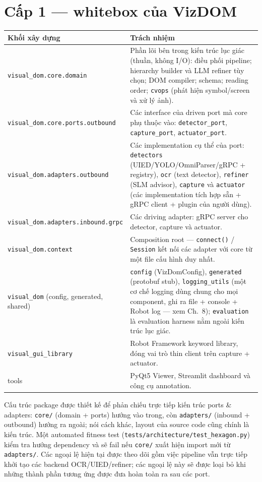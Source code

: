 \documentclass[11pt,a4paper]{report}
\newcommand{\code}[1]{\texttt{#1}}
\begin{document}
\section{Cấp 1 --- whitebox của VizDOM}
\begin{longtable}{@{}p{3.8cm}p{10.8cm}@{}}
\toprule
\textbf{Khối xây dựng} & \textbf{Trách nhiệm} \\
\midrule
\endhead
\code{visual\_dom.core.domain} & Phần lõi bên trong kiến trúc lục giác (thuần, không I/O): điều phối pipeline; hierarchy builder và LLM refiner tùy chọn; DOM compiler; schema; reading order; \code{cvops} (phát hiện symbol/screen và xử lý ảnh). \\
\code{visual\_dom.core.ports.\allowbreak outbound} & Các interface của driven port mà core phụ thuộc vào: \code{detector\_port}, \code{capture\_port}, \code{actuator\_port}. \\
\code{visual\_dom.adapters.\allowbreak outbound} & Các implementation cụ thể của port: \code{detectors} (UIED/YOLO/OmniParser/gRPC + registry), \code{ocr} (text detector), \code{refiner} (SLM advisor), \code{capture} và \code{actuator} (các implementation tích hợp sẵn + gRPC client + plugin của người dùng). \\
\code{visual\_dom.adapters.\allowbreak inbound.grpc} & Các driving adapter: gRPC server cho detector, capture và actuator. \\
\code{visual\_dom.context} & Composition root --- \code{connect()} / \code{Session} kết nối các adapter với core từ một file cấu hình duy nhất. \\
\code{visual\_dom} (config, generated, shared) & \code{config} (VizDomConfig), \code{generated} (protobuf stub), \code{logging\_utils} (một cơ chế logging dùng chung cho mọi component, ghi ra file + console + Robot log --- xem Ch.~8); \code{evaluation} là evaluation harness nằm ngoài kiến trúc lục giác. \\
\code{visual\_gui\_library} & Robot Framework keyword library, đóng vai trò thin client trên capture + actuator. \\
tools & PyQt5 Viewer, Streamlit dashboard và công cụ annotation. \\
\bottomrule
\end{longtable}

\noindent Cấu trúc package được thiết kế để phản chiếu trực tiếp kiến trúc ports \& adapters:
\code{core/} (domain + ports) hướng vào trong, còn \code{adapters/} (inbound + outbound)
hướng ra ngoài; nói cách khác, layout của source code cũng chính là kiến trúc. Một
automated fitness test (\code{tests/architecture/test\_hexagon.py}) kiểm tra hướng
dependency và sẽ fail nếu \code{core/} xuất hiện import mới từ \code{adapters/}.
Các ngoại lệ hiện tại được theo dõi gồm việc pipeline vẫn trực tiếp khởi tạo các backend
OCR/UIED/refiner; các ngoại lệ này sẽ được loại bỏ khi những thành phần tương ứng được
đưa hoàn toàn ra sau các port.
\end{document}
